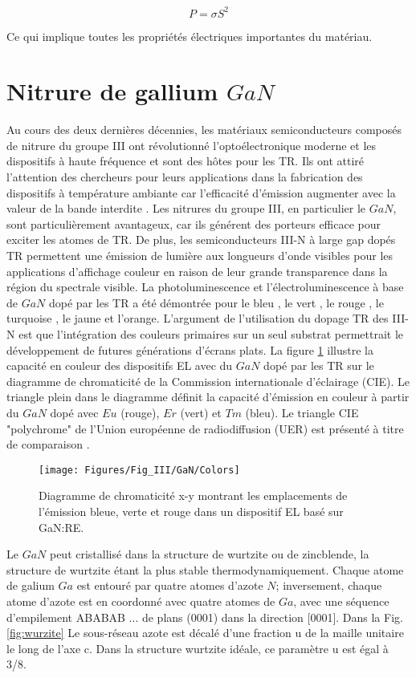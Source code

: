 \begin{equation}\label{10}
	P = \sigma S^{2}
\end{equation}

Ce qui implique toutes les propriétés électriques importantes du matériau. 

\newpage
\section{Nitrure de gallium $ GaN $}

Au cours des deux dernières décennies, les matériaux semiconducteurs composés de nitrure du groupe III ont révolutionné l'optoélectronique moderne et les dispositifs à haute fréquence et sont des hôtes pour les TR. Ils ont attiré l'attention  des chercheurs pour leurs applications dans la fabrication des dispositifs à température ambiante car l'efficacité d'émission augmenter avec la valeur de la bande interdite \cite{c12}. Les nitrures du groupe III, en particulier le $ GaN $, sont particulièrement avantageux, car ils générent des porteurs efficace pour exciter les atomes de TR. De plus, les semiconducteurs III-N à large gap dopés TR permettent une émission de lumière aux longueurs d'onde visibles pour les applications d'affichage couleur en raison de leur grande transparence dans la région du spectrale visible. La photoluminescence et l'électroluminescence à base de $ GaN $ dopé par les TR a été démontrée pour le bleu \cite{c13,c14,c15}, le vert \cite{c14,c16,c17,c18,c19}, le rouge \cite{c20}, le turquoise \cite{c21}, le jaune et l'orange. L'argument  de l'utilisation du dopage TR des III-N  est que l'intégration des couleurs primaires sur un seul substrat permettrait le développement de futures générations d'écrans plats. La figure \ref{fig:colors} illustre la capacité en couleur des dispositifs EL avec du $ GaN $ dopé par les TR sur le diagramme de chromaticité de la Commission internationale d'éclairage (CIE). Le triangle plein dans le diagramme définit la capacité d'émission en couleur à partir du $ GaN $ dopé avec $ Eu $ (rouge), $ Er $ (vert) et $ Tm $ (bleu). Le triangle CIE "polychrome" de l’Union européenne de radiodiffusion (UER) est présenté à titre de comparaison \cite{c23}.
\begin{figure}
	\centering
	\texttt{[image: Figures/Fig\_III/GaN/Colors]}
	\caption{Diagramme de chromaticité x-y  montrant les emplacements de l'émission bleue, verte et rouge dans un dispositif EL basé sur GaN:RE.}
	\label{fig:colors}
\end{figure}
Le $ GaN $ peut cristallisé dans la structure de wurtzite ou de zincblende, la structure de wurtzite étant la plus stable thermodynamiquement. Chaque atome de galium $ Ga $ est entouré par quatre atomes d'azote $ N $; inversement, chaque atome d'azote est en coordonné avec quatre atomes de $ Ga $, avec une séquence d'empilement ABABAB ... de plans (0001) dans la direction [0001]. Dans la Fig.\ref {fig:wurzite} Le sous-réseau azote est décalé d'une fraction u de la maille unitaire le long de l'axe c. Dans la structure wurtzite idéale, ce paramètre u est égal à 3/8.

